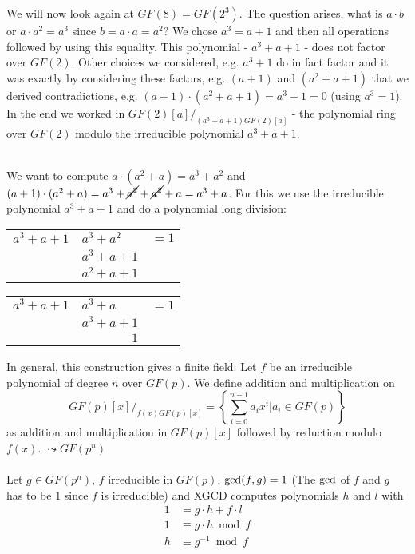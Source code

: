 We will now look again at $GF(8) = GF(2^3)$. The question arises, what is $a \cdot b$ or $a \cdot a^2 = a^3$ since $b= a \cdot a = a^2$? We chose $a^3 = a+1$ and then all operations followed by using this equality. This polynomial - $a^3 + a +1$ - does not factor over $GF(2)$. Other choices we considered, e.g. $a^3 + 1$ do in fact factor and it was exactly by considering these factors, e.g. $(a+1)$ and $(a^2 + a +1)$ that we derived contradictions, e.g. $(a+1)\cdot (a^2+a+1) = a^3+1 = 0$ (using $a^3=1$). In the end we worked in $GF(2)[a]/_{(a^3+a+1)GF(2)[a]}$ - the polynomial ring over $GF(2)$ modulo the irreducible polynomial $a^3+a+1$.

\begin{example}\ \\
We want to compute $a \cdot (a^2 + a) = a^3 + a^2$ and $(a+1) \cdot (a^2+a) = a^3 + \cancel{a^2} + \cancel{a^2} + a = a^3 +a$. For this we use the irreducible polynomial $a^3 + a +1$ and do a polynomial long division: \ \\

\bgroup
\def\arraystretch{1.5}
\begin{tabular}{clc}
\cline{2-2}
 \multicolumn{1}{r|}{$a^3 +a+1$} & $a^3+a^2$ & $ = 1$ \\
 & $a^3+a+1$ & \\
 \cline{2-2}
 & \multicolumn{1}{r}{$a^2+a+1$} & \\
\end{tabular}
\egroup \hfill
\bgroup
\def\arraystretch{1.5}
\begin{tabular}{clc}
\cline{2-2}
 \multicolumn{1}{r|}{$a^3 +a+1$} & $a^3+a$ & $ = 1$ \\
 & $a^3+a+1$ & \\
 \cline{2-2}
 & \multicolumn{1}{r}{$1$} & \\
\end{tabular}
\egroup

\end{example}

In general, this construction gives a finite field:
Let $f$ be an irreducible polynomial of degree $n$ over $GF(p)$. We define addition and multiplication on
\[
	GF(p)[x]/_{f(x)GF(p)[x]} = \left\{ \sum\limits_{i=0}^{n-1} a_i x^i | a_i \in GF(p) \right\}
\]
as addition and multiplication in $GF(p)[x]$ followed by reduction modulo $f(x)$. $\leadsto GF(p^n)$ \\ \\

Let $g \in GF(p^n)$, $f$ irreducible in $GF(p)$. $\operatorname{gcd}(f,g) =1$ (The $\operatorname{gcd}$ of $f$ and $g$ has to be $1$ since $f$ is irreducible) and \textsc{XGCD} computes polynomials $h$ and $l$ with
\begin{align*}
1 &= g \cdot h + f \cdot l \\
1 &\equiv g \cdot h \bmod f \\
h &\equiv g^{-1} \bmod f
\end{align*}

